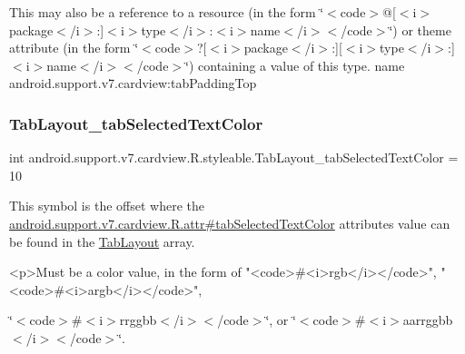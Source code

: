 This may also be a reference to a resource (in the form \char`\"{}$<$code$>$@\mbox{[}$<$i$>$package$<$/i$>$\+:\mbox{]}$<$i$>$type$<$/i$>$\+:$<$i$>$name$<$/i$>$$<$/code$>$\char`\"{}) or theme attribute (in the form \char`\"{}$<$code$>$?\mbox{[}$<$i$>$package$<$/i$>$\+:\mbox{]}\mbox{[}$<$i$>$type$<$/i$>$\+:\mbox{]}$<$i$>$name$<$/i$>$$<$/code$>$\char`\"{}) containing a value of this type.  name android.\+support.\+v7.\+cardview\+:tab\+Padding\+Top \mbox{\label{classandroid_1_1support_1_1v7_1_1cardview_1_1R_1_1styleable_abd3588bf878b74235a5268f7295f3b4f}} 
\subsubsection{\texorpdfstring{Tab\+Layout\+\_\+tab\+Selected\+Text\+Color}{TabLayout\_tabSelectedTextColor}}
{\footnotesize\ttfamily int android.\+support.\+v7.\+cardview.\+R.\+styleable.\+Tab\+Layout\+\_\+tab\+Selected\+Text\+Color = 10\hspace{0.3cm}{\ttfamily [static]}}

This symbol is the offset where the \hyperlink{classandroid_1_1support_1_1v7_1_1cardview_1_1R_1_1attr_a3ffecd1757b4e0a371094c0edb7234e3}{android.\+support.\+v7.\+cardview.\+R.\+attr\#tab\+Selected\+Text\+Color} attribute\textquotesingle{}s value can be found in the \hyperlink{classandroid_1_1support_1_1v7_1_1cardview_1_1R_1_1styleable_afa0dc9366603eaec9e38d99273ba8512}{Tab\+Layout} array.

\begin{DoxyVerb}      <p>Must be a color value, in the form of "<code>#<i>rgb</i></code>", "<code>#<i>argb</i></code>",
\end{DoxyVerb}
 \char`\"{}$<$code$>$\#$<$i$>$rrggbb$<$/i$>$$<$/code$>$\char`\"{}, or \char`\"{}$<$code$>$\#$<$i$>$aarrggbb$<$/i$>$$<$/code$>$\char`\"{}. 

